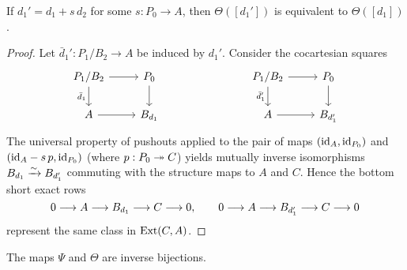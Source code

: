 \begin{lemma*}
	If \( d_1' = d_1 + s\, d_2 \) for some \( s: P_0 \to A \), then \( \Theta([d_1']) \) is equivalent to \( \Theta([d_1]) \).
\end{lemma*}

\begin{proof}
	Let \( \bar d_1': P_1/B_2 \to A \) be induced by \( d_1' \). Consider the cocartesian squares
	\[
		\begin{tikzcd}
			P_1/B_2 \arrow[r] \arrow[d, "\bar d_1"'] & P_0 \arrow[d] &\qquad& P_1/B_2 \arrow[r] \arrow[d, "\bar d_1'"'] & P_0 \arrow[d] \\
			A \arrow[r] & B_{d_1} && A \arrow[r] & B_{d_1'}
		\end{tikzcd}
	\]
	The universal property of pushouts applied to the pair of maps \( (\mathrm{id}_A, \mathrm{id}_{P_0}) \) and \( (\mathrm{id}_A - s\, p, \mathrm{id}_{P_0}) \) (where \( p: P_0 \twoheadrightarrow C \)) yields mutually inverse isomorphisms \( B_{d_1} \xrightarrow{\sim} B_{d_1'} \) commuting with the structure maps to \( A \) and \( C \). Hence the bottom short exact rows
	\[
		0 \longrightarrow A \longrightarrow B_{d_1} \longrightarrow C \longrightarrow 0,\qquad 0 \longrightarrow A \longrightarrow B_{d_1'} \longrightarrow C \longrightarrow 0
	\]
	represent the same class in \( \operatorname{Ext}(C,A) \).
\end{proof}

\begin{proposition*}[w/o proof]
	The maps \( \Psi \) and \( \Theta \) are inverse bijections.
\end{proposition*}